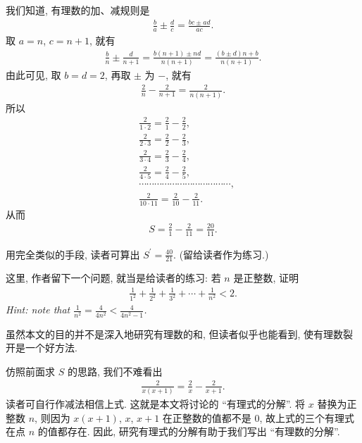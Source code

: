 我们知道, 有理数的加、减规则是
\begin{align*}
    \frac{b}{a} \pm \frac{d}{c} = \frac{bc \pm ad}{ac}.
\end{align*}
取 $a = n$, $c = n+1$, 就有
\begin{align*}
    \frac{b}{n} \pm \frac{d}{n+1} = \frac{b(n+1) \pm nd}{n(n+1)} = \frac{(b \pm d)n + b}{n(n+1)}.
\end{align*}
由此可见, 取 $b = d = 2$, 再取 $\pm$ 为 $-$, 就有
\begin{align*}
    \frac{2}{n} - \frac{2}{n+1} = \frac{2}{n(n+1)}.
\end{align*}
所以
\begin{align*}
     & \frac{2}{1 \cdot 2} = \frac{2}{1} - \frac{2}{2},     \\
     & \frac{2}{2 \cdot 3} = \frac{2}{2} - \frac{2}{3},     \\
     & \frac{2}{3 \cdot 4} = \frac{2}{3} - \frac{2}{4},     \\
     & \frac{2}{4 \cdot 5} = \frac{2}{4} - \frac{2}{5},     \\
     & \cdots \cdots \cdots \cdots \cdots \cdots
    \cdots \cdots \cdots \cdots \cdots \cdots,              \\
     & \frac{2}{10 \cdot 11} = \frac{2}{10} - \frac{2}{11}.
\end{align*}
从而
\begin{align*}
    S = \frac{2}{1} - \frac{2}{11} = \frac{20}{11}.
\end{align*}

用完全类似的手段, 读者可算出 $S^{\prime} = \frac{40}{21}$. (留给读者作为练习.)

这里, 作者留下一个问题, 就当是给读者的练习: 若 $n$ 是正整数, 证明
\begin{align*}
    \frac{1}{1^2} + \frac{1}{2^2} + \frac{1}{3^2} + \cdots + \frac{1}{n^2} < 2.
\end{align*}
\textit{Hint: note that $\frac{1}{n^2} = \frac{4}{4n^2} < \frac{4}{4n^2 - 1}$.}

虽然本文的目的并不是深入地研究有理数的和, 但读者似乎也能看到, 使有理数裂开是一个好方法.

仿照前面求 $S$ 的思路, 我们不难看出
\begin{align*}
    \frac{2}{x(x+1)} = \frac{2}{x} - \frac{2}{x+1}.
\end{align*}
读者可自行作减法相信上式. 这就是本文将讨论的 ``有理式的分解''. 将 $x$ 替换为正整数 $n$, 则因为 $x(x+1)$, $x$, $x+1$ 在正整数的值都不是 $0$, 故上式的三个有理式在点 $n$ 的值都存在. 因此, 研究有理式的分解有助于我们写出 ``有理数的分解''.

